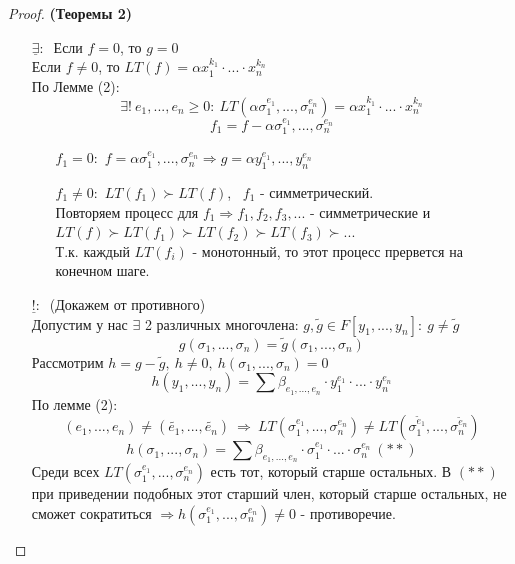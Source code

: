 \documentclass[a4paper, 12pt]{article}
\theoremstyle{definition}
\begin{document}
   \begin{proof} \textbf{(Теоремы 2)} 
    \begin{itemize}
      \item[$\underline{\exists}: \ $] Если $f = 0$, то $g = 0$\\
      Если $f \neq 0$, то $LT(f) = \alpha x_1^{k_1} \cdot ... \cdot x_n^{k_n}$\\
      По Лемме (2): 
      $$\exists ! \ e_1,...,e_n \geq 0: \ LT(\alpha \sigma_1^{e_1},...,\sigma_n^{e_n}) = \alpha x_1^{k_1} \cdot ... \cdot x_n^{k_n}$$
      $$f_1 = f - \alpha \sigma_1^{e_1},...,\sigma_n^{e_n}$$
      \begin{itemize}
        \item[$f_1 = 0:$] $f = \alpha \sigma_1^{e_1},...,\sigma_n^{e_n} \Longrightarrow g = \alpha y_1^{e_1},...,y_n^{e_n}$
        \item[$f_1 \neq 0:$] $LT(f_1) \succ LT(f)$, \ $f_1$ - симметрический.\\
        Повторяем процесс для $f_1 \Longrightarrow f_1,f_2,f_3,...$ - симметрические и\\
        $LT(f) \succ LT(f_1) \succ LT(f_2) \succ LT(f_3) \succ ...$\\
        Т.к. каждый $LT(f_i)$ - монотонный, то этот процесс прервется на конечном шаге.   
      \end{itemize}
      \item[$\underline{!}: \ $] (Докажем от противного)\\
      Допустим у нас $\exists$  2 различных многочлена: $g, \widetilde{g} \in F[y_1,...,y_n]: \ g \neq \widetilde{g}$ 
      $$g(\sigma_1,...,\sigma_n) = \widetilde{g}(\sigma_1,...,\sigma_n)$$
      Рассмотрим $h = g - \widetilde{g}, \ h \neq 0, \ h(\sigma_1,...,\sigma_n) = 0$
      $$h(y_1,...,y_n) = \sum \beta_{e_1,...,e_n} \cdot y_1^{e_1} \cdot ... \cdot y_n^{e_n}$$
      По лемме (2):
      $$(e_1,...,e_n) \neq (\widetilde{e_1},...,\widetilde{e_n})\ \Longrightarrow \ LT(\sigma_1^{e_1},...,\sigma_n^{e_n}) \neq LT(\sigma_1^{\widetilde{e}_1},...,\sigma_n^{\widetilde{e}_n})$$
      $$h(\sigma_1,...,\sigma_n) = \sum \beta_{e_1,...,e_n} \cdot \sigma_1^{e_1} \cdot ... \cdot \sigma_n^{e_n} \ (**)$$
      Среди всех $LT(\sigma_1^{e_1},...,\sigma_n^{e_n})$ есть тот, который старше остальных. В $(**)$ при приведении подобных этот старший член, который старше остальных, не сможет сократиться $\Longrightarrow h(\sigma_1^{e_1},...,\sigma_n^{e_n}) \neq 0$ - противоречие. 
    \end{itemize}
   \end{proof}
\end{document}
